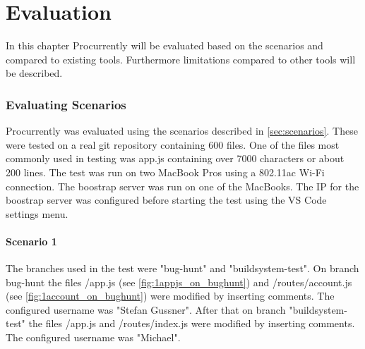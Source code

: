 \chapter{Evaluation}
\label{sec:results}

In this chapter Procurrently will be evaluated based on the scenarios and compared to existing tools.
Furthermore limitations compared to other tools will be described.

\subsection{Evaluating Scenarios}

Procurrently was evaluated using the scenarios described in \autoref{sec:scenarios}.
These were tested on a real git repository containing 600 files. One of the files most commonly used in testing was app.js containing over 7000 characters or about 200 lines. The test was run on two MacBook Pros using a 802.11ac Wi-Fi connection.
The boostrap server was run on one of the MacBooks. The IP for the boostrap server was configured before starting the test using the VS Code settings menu. 

\subsubsection{Scenario 1}

The branches used in the test were "bug-hunt" and "buildsystem-test". On branch bug-hunt the files /app.js (see \autoref{fig:1appjs_on_bughunt}) and /routes/account.js (see \autoref{fig:1account_on_bughunt}) were modified by inserting comments. The configured username was "Stefan Gussner". 
After that on branch "buildsystem-test" the files /app.js and /routes/index.js were modified by inserting comments. The configured username was "Michael".

